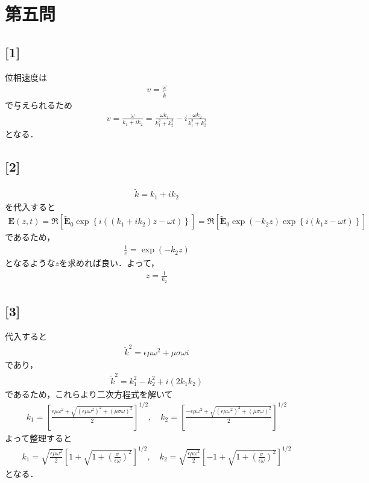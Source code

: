 \documentclass[12pt,dvipdfmx]{jsarticle}
\begin{document}
\section*{\Large{第五問}}
\subsection*{\large{[1]}}
位相速度は
\begin{eqnarray}
  v = \frac{\omega}{\tilde{k}}
\end{eqnarray}
で与えられるため
\begin{eqnarray}
  v = \frac{\omega}{k_1 + ik_2} = \frac{\omega k_1}{k_1^2 + k_2^2} - i\frac{\omega k_2}{k_1^2 + k_2^2}
\end{eqnarray}
となる．
\subsection*{\large{[2]}}
\begin{eqnarray}
  \tilde{k} = k_1+ik_2
\end{eqnarray}
を代入すると
\begin{eqnarray}
  \bm{E}(z,t) = \Re\left[ \tilde{\bm{E}}_0 \exp\left\{ i( ( k_1+ik_2)z-\omega t ) \right\} \right] =  \Re\left[ \tilde{\bm{E}}_0\exp\left( -k_2z \right) \exp\left\{ i( k_1z-\omega t ) \right\} \right] 
\end{eqnarray}
であるため，
\begin{eqnarray}
  \frac{1}{e} = \exp (-k_2z)
\end{eqnarray}
となるような$z$を求めれば良い．よって，
\begin{eqnarray}
  z = \frac{1}{k_2}
\end{eqnarray}
\subsection*{\large{[3]}}
代入すると
\begin{eqnarray}
  \tilde{k}^2 =\epsilon\mu\omega^2 + \mu \sigma \omega i
\end{eqnarray}
であり，
\begin{eqnarray}
  \tilde{k}^2 = k_1^2-k_2^2 + i(2k_1k_2)
\end{eqnarray}
であるため，これらより二次方程式を解いて
\begin{eqnarray}
  k_1 = \left[ \frac{\epsilon\mu \omega^2+\sqrt{ (\epsilon\mu \omega^2)^2 + (\mu\sigma\omega)^2 }}{2} \right]^{1/2},\quad k_2 = \left[ \frac{-\epsilon\mu \omega^2+\sqrt{ (\epsilon\mu \omega^2)^2 + (\mu\sigma\omega)^2 }}{2} \right]^{1/2}
\end{eqnarray}
よって整理すると
\begin{eqnarray}
  k_1 = \sqrt{\frac{\epsilon\mu\omega^2}{2}}\left[ 1+\sqrt{1+\left(\frac{\sigma}{\epsilon\omega}\right)^2} \right]^{1/2},\quad k_2 = \sqrt{\frac{\epsilon\mu\omega^2}{2}}\left[ -1+\sqrt{1+\left(\frac{\sigma}{\epsilon\omega}\right)^2} \right]^{1/2}
\end{eqnarray}
となる．
\end{document}
